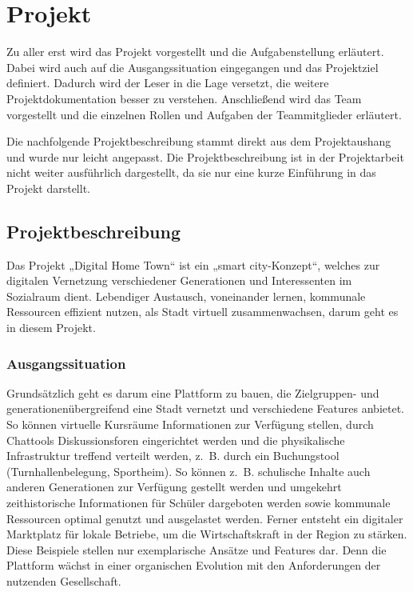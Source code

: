 \chapter{Projekt}
\label{ch:project}

Zu aller erst wird das Projekt vorgestellt und die Aufgabenstellung erläutert. Dabei wird auch auf die Ausgangssituation eingegangen und das Projektziel definiert.
Dadurch wird der Leser in die Lage versetzt, die weitere Projektdokumentation besser zu verstehen.
Anschließend wird das Team vorgestellt und die einzelnen Rollen und Aufgaben der Teammitglieder erläutert.

Die nachfolgende Projektbeschreibung stammt direkt aus dem Projektaushang und wurde nur leicht angepasst. Die Projektbeschreibung ist in der Projektarbeit nicht weiter ausführlich dargestellt, da sie nur eine kurze Einführung in das Projekt darstellt.

\section{Projektbeschreibung}
\label{sec:project-description}

Das Projekt „Digital Home Town“ ist ein „smart city-Konzept“, welches zur digitalen
Vernetzung verschiedener Generationen und Interessenten im Sozialraum dient. Lebendiger
Austausch, voneinander lernen, kommunale Ressourcen effizient nutzen, als Stadt virtuell
zusammenwachsen, darum geht es in diesem Projekt.


\subsection{Ausgangssituation}
\label{sub:project-start}

Grundsätzlich geht es darum eine Plattform zu bauen, die Zielgruppen- und generationenübergreifend eine Stadt vernetzt und verschiedene Features anbietet.
So können virtuelle Kursräume Informationen zur Verfügung stellen, durch Chattools Diskussionsforen eingerichtet werden und die physikalische Infrastruktur treffend verteilt werden, z. B. durch ein Buchungstool (Turnhallenbelegung, Sportheim).
So können z. B. schulische Inhalte auch anderen Generationen zur Verfügung gestellt werden und umgekehrt zeithistorische Informationen für Schüler dargeboten werden sowie kommunale Ressourcen optimal genutzt und ausgelastet werden.
Ferner entsteht ein digitaler Marktplatz für lokale Betriebe, um die Wirtschaftskraft in der Region zu stärken.
Diese Beispiele stellen nur exemplarische Ansätze und Features dar.
Denn die Plattform wächst in einer organischen Evolution mit den Anforderungen der nutzenden Gesellschaft.

